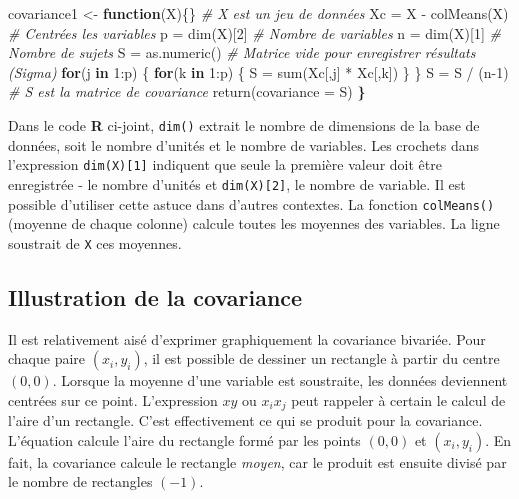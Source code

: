 \documentclass[
]{book}
\newenvironment{Shaded}{}{}
\newcommand{\AttributeTok}[1]{#1}
\newcommand{\CommentTok}[1]{\textit{#1}}
\newcommand{\ControlFlowTok}[1]{\textbf{#1}}
\newcommand{\DecValTok}[1]{#1}
\newcommand{\ErrorTok}[1]{\textbf{#1}}
\newcommand{\FunctionTok}[1]{#1}
\newcommand{\NormalTok}[1]{#1}
\newcommand{\OtherTok}[1]{#1}
\newcommand{\SpecialCharTok}[1]{#1}
\begin{document}
\begin{Shaded}
\begin{Highlighting}[]
\NormalTok{covariance1 }\OtherTok{\textless{}{-}} \ControlFlowTok{function}\NormalTok{(X)\{\} }
\CommentTok{\# X est un jeu de données}
\NormalTok{Xc }\OtherTok{=}\NormalTok{ X }\SpecialCharTok{{-}} \FunctionTok{colMeans}\NormalTok{(X) }\CommentTok{\# Centrées les variables}
\NormalTok{p }\OtherTok{=} \FunctionTok{dim}\NormalTok{(X)[}\DecValTok{2}\NormalTok{]    }\CommentTok{\# Nombre de variables }
\NormalTok{n }\OtherTok{=} \FunctionTok{dim}\NormalTok{(X)[}\DecValTok{1}\NormalTok{]    }\CommentTok{\# Nombre de sujets}
\NormalTok{S }\OtherTok{=} \FunctionTok{as.numeric}\NormalTok{() }\CommentTok{\# Matrice vide pour enregistrer résultats (Sigma)}
\ControlFlowTok{for}\NormalTok{(j }\ControlFlowTok{in} \DecValTok{1}\SpecialCharTok{:}\NormalTok{p) \{}
  \ControlFlowTok{for}\NormalTok{(k }\ControlFlowTok{in} \DecValTok{1}\SpecialCharTok{:}\NormalTok{p) \{}
\NormalTok{    S }\OtherTok{=} \FunctionTok{sum}\NormalTok{(Xc[,j] }\SpecialCharTok{*}\NormalTok{ Xc[,k])}
\NormalTok{  \}}
\NormalTok{\}}
\NormalTok{S }\OtherTok{=}\NormalTok{ S }\SpecialCharTok{/}\NormalTok{ (n}\DecValTok{{-}1}\NormalTok{)}
\CommentTok{\# S est la matrice de covariance}
\FunctionTok{return}\NormalTok{(}\AttributeTok{covariance =}\NormalTok{ S)}
\ErrorTok{\}}
\end{Highlighting}
\end{Shaded}

Dans le code \textbf{R} ci-joint, \texttt{dim()} extrait le nombre de dimensions de la base de données, soit le nombre d'unités et le nombre de variables. Les crochets dans l'expression \texttt{dim(X){[}1{]}} indiquent que seule la première valeur doit être enregistrée - le nombre d'unités et \texttt{dim(X){[}2{]}}, le nombre de variable. Il est possible d'utiliser cette astuce dans d'autres contextes. La fonction \texttt{colMeans()} (moyenne de chaque colonne) calcule toutes les moyennes des variables. La ligne soustrait de \texttt{X} ces moyennes.

\hypertarget{illustration-de-la-covariance}{%
\subsection{Illustration de la covariance}\label{illustration-de-la-covariance}}

Il est relativement aisé d'exprimer graphiquement la covariance bivariée. Pour chaque paire \((x_i,y_i)\), il est possible de dessiner un rectangle à partir du centre \((0, 0)\). Lorsque la moyenne d'une variable est soustraite, les données deviennent centrées sur ce point. L'expression \(xy\) ou \(x_ix_j\) peut rappeler à certain le calcul de l'aire d'un rectangle. C'est effectivement ce qui se produit pour la covariance. L'équation calcule l'aire du rectangle formé par les points \((0,0)\) et \((x_i,y_i)\). En fait, la covariance calcule le rectangle \emph{moyen}, car le produit est ensuite divisé par le nombre de rectangles \((-1)\).
\end{document}
